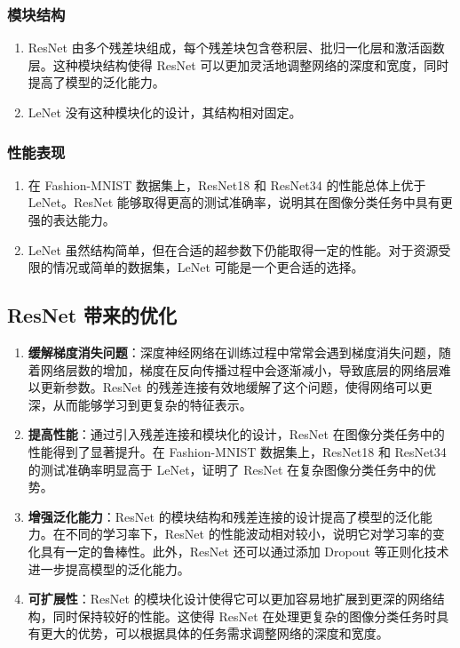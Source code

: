 \documentclass[UTF8]{ctexart}
\begin{document}
\subsubsection{模块结构}
\begin{enumerate}
    \item ResNet 由多个残差块组成，每个残差块包含卷积层、批归一化层和激活函数层。这种模块结构使得 ResNet 可以更加灵活地调整网络的深度和宽度，同时提高了模型的泛化能力。
    \item LeNet 没有这种模块化的设计，其结构相对固定。
\end{enumerate}
\subsubsection{性能表现}
\begin{enumerate}
    \item 在 Fashion-MNIST 数据集上，ResNet18 和 ResNet34 的性能总体上优于 LeNet。ResNet 能够取得更高的测试准确率，说明其在图像分类任务中具有更强的表达能力。
    \item LeNet 虽然结构简单，但在合适的超参数下仍能取得一定的性能。对于资源受限的情况或简单的数据集，LeNet 可能是一个更合适的选择。
\end{enumerate}

\subsection{ResNet 带来的优化}
\begin{enumerate}
    \item \textbf{缓解梯度消失问题}：深度神经网络在训练过程中常常会遇到梯度消失问题，随着网络层数的增加，梯度在反向传播过程中会逐渐减小，导致底层的网络层难以更新参数。ResNet 的残差连接有效地缓解了这个问题，使得网络可以更深，从而能够学习到更复杂的特征表示。
    \item \textbf{提高性能}：通过引入残差连接和模块化的设计，ResNet 在图像分类任务中的性能得到了显著提升。在 Fashion-MNIST 数据集上，ResNet18 和 ResNet34 的测试准确率明显高于 LeNet，证明了 ResNet 在复杂图像分类任务中的优势。
    \item \textbf{增强泛化能力}：ResNet 的模块结构和残差连接的设计提高了模型的泛化能力。在不同的学习率下，ResNet 的性能波动相对较小，说明它对学习率的变化具有一定的鲁棒性。此外，ResNet 还可以通过添加 Dropout 等正则化技术进一步提高模型的泛化能力。
    \item \textbf{可扩展性}：ResNet 的模块化设计使得它可以更加容易地扩展到更深的网络结构，同时保持较好的性能。这使得 ResNet 在处理更复杂的图像分类任务时具有更大的优势，可以根据具体的任务需求调整网络的深度和宽度。
\end{enumerate}
\end{document}
